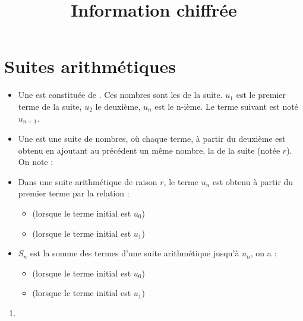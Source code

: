 \documentclass[12pt,a4paper]{article}
\date{}
\title{Information chiffrée }
\begin{document}




\section{Suites arithmétiques}



\begin{mybilan}
	\begin{itemize}
		\item Une  est constituée de . Ces nombres sont les  de la suite. $u_1$ est le premier terme de la suite, $u_2$ le deuxième, $u_n$ est le n-ième. Le terme suivant est noté $u_{n+1}$.\\
		
		\item Une  est une suite de nombres, où chaque terme, à partir du deuxième est obtenu en ajoutant au précédent un même nombre, la  de la suite (notée $r$).	
		On note :
			
			
			
		\item Dans une suite arithmétique de raison $r$, le terme $u_n$ est obtenu à partir du premier terme par la relation :
			\begin{itemize}
				\item {} (lorsque le terme initial est $u_0$) 
				\item {} (lorsque le terme initial est $u_1$)
			\end{itemize}
			
		\item $S_n$ est la somme des termes d'une suite arithmétique jusqu'à $u_n$, on a :
			\begin{itemize}
				\item {} (lorsque le terme initial est $u_0$) 
				\item {} (lorsque le terme initial est $u_1$)
			\end{itemize}
	\end{itemize}	
\end{mybilan}	
\begin{enumerate}[label=\arabic*)]
	\item 
\end{enumerate}
\end{document}
